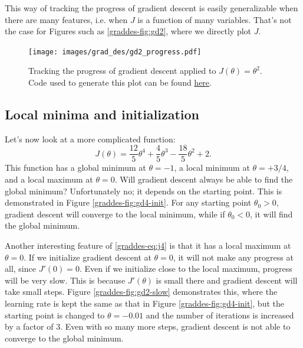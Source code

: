 \documentclass{article}
\theoremstyle{definition}
\begin{document}
This way of tracking the progress of gradient descent is easily generalizable when there are many features, i.e. when $J$ is a function of many variables. That's not the case for Figures such as \ref{graddes-fig:gd2}, where we directly plot $J$.

\begin{figure}[ht]
\centering
\texttt{[image: images/grad\_des/gd2\_progress.pdf]}
\caption{Tracking the progress of gradient descent applied to  $J(\theta)=\theta^2$. Code used to generate this plot can be found \href{https://github.com/siavashaslanbeigi/ml_notes/blob/master/src/grad_des/basics.ipynb}{\color{blue} here}.}
\label{graddes-fig:gd2-progress}
\end{figure}


\subsection{Local minima and initialization}
Let's now look at a more complicated function:
\begin{equation}
   J(\theta) = \frac{12}{5} \theta^4 + \frac{4}{5} \theta^3 - \frac{18}{5} \theta^2 + 2.
   \label{graddes-eq:j4}
\end{equation}
This function has a global minimum at $\theta=-1$, a local minimum at $\theta=+3/4$, and a local maximum at $\theta=0$. Will gradient descent always be able to find the global minimum? Unfortunately no; it depends on the starting point. This is demonstrated in Figure \ref{graddes-fig:gd4-init}. For any starting point $\theta_0>0$, gradient descent will converge to the local minimum, while if $\theta_0<0$, it will find the global minimum.

Another interesting feature of \eqref{graddes-eq:j4} is that it has a local maximum at $\theta=0$. If we initialize gradient descent at $\theta=0$, it will not make any progress at all, since $J'(0)=0$. Even if we initialize close to the local maximum, progress will be very slow. This is because $J'(\theta)$ is small there and gradient descent will take small steps. Figure \ref{graddes-fig:gd2-slow} demonstrates this, where the learning rate is kept the same as that in Figure \ref{graddes-fig:gd4-init}, but the starting point is changed to $\theta=-0.01$ and the number of iterations is increased by a factor of 3. Even with so many more steps, gradient descent is not able to converge to the global minimum.
\end{document}
